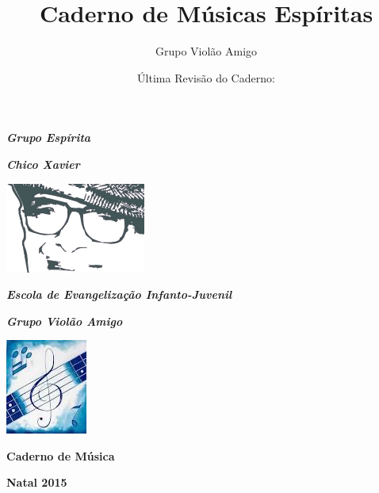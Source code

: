 \documentclass[a4,12pt,oneside]{book}
\title{Caderno de Músicas Espíritas}
\author{Grupo Violão Amigo}
\date{Última Revisão do Caderno: \RelDate}
\begin{document}

\newpage
\thispagestyle{empty}
\begin{titlepage}

	\begin{center}
	
	
		\LARGE{\textbf{\textit{Grupo Espírita}}}
		
		\LARGE{\textbf{\textit{Chico Xavier}}}
		
		\vspace{2cm}
	
		\includegraphics[scale=1.2]{chico.jpg}
		
		\vspace{2cm}
	
		\Large{\textbf{\textit{Escola de Evangelização Infanto-Juvenil}}}
	
		\Large{\textbf{\textit{Grupo Violão Amigo}}}
		
		\vspace{2cm}
		\includegraphics[scale=1.5]{nota.jpg}
		
		\vspace{3cm}
		
		\Large{\textbf{Caderno de Música}}
	
		\Large{\textbf{Natal 2015}}
	\end{center}
\end{titlepage}
\end{document}
